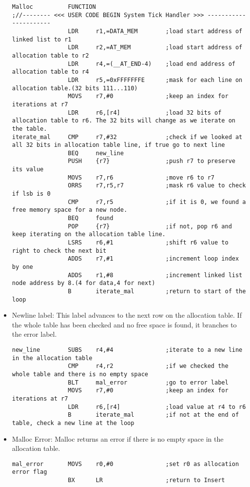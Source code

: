 \documentclass[pdftex,12pt,a4paper]{article}
\begin{document}
\begin{itemize}
\begin{lstlisting}[caption=Malloc iteration, style=customasm]
Malloc			FUNCTION			
;//-------- <<< USER CODE BEGIN System Tick Handler >>> ----------------------	
				LDR 	r1,=DATA_MEM		;load start address of linked list to r1
				LDR 	r2,=AT_MEM			;load start address of allocation table to r2
				LDR		r4,=(__AT_END-4)	;load end address of allocation table to r4
				LDR		r5,=0xFFFFFFFE		;mask for each line on allocation table.(32 bits 111...110)
				MOVS	r7,#0				;keep an index for iterations at r7
				LDR		r6,[r4]				;load 32 bits of allocation table to r6. The 32 bits will change as we iterate on the table.
iterate_mal		CMP		r7,#32				;check if we looked at all 32 bits in allocation table line, if true go to next line
				BEQ		new_line
				PUSH	{r7}				;push r7 to preserve its value
				MOVS	r7,r6				;move r6 to r7
				ORRS	r7,r5,r7			;mask r6 value to check if lsb is 0					
				CMP 	r7,r5				;if it is 0, we found a free memory space for a new node.
				BEQ		found
				POP		{r7}				;if not, pop r6 and keep iterating on the allocation table line.
				LSRS	r6,#1				;shift r6 value to right to check the next bit
				ADDS	r7,#1				;increment loop index by one
				ADDS	r1,#8				;increment linked list node address by 8.(4 for data,4 for next)
				B		iterate_mal			;return to start of the loop	
\end{lstlisting}

\item   Newline label: This label advances to the next row on the allocation table. If the whole table has been checked and no free space is found, it branches to the error label.

\begin{lstlisting}[caption=Malloc newline label, style=customasm]
new_line		SUBS	r4,#4				;iterate to a new line in the allocation table
				CMP		r4,r2				;if we checked the whole table and there is no empty space
				BLT		mal_error			;go to error label
				MOVS	r7,#0				;keep an index for iterations at r7
				LDR		r6,[r4]				;load value at r4 to r6
				B		iterate_mal			;if not at the end of table, check a new line at the loop
\end{lstlisting}

\item Malloc Error: Malloc returns an error if there is no empty space in the allocation table.
\begin{lstlisting}[caption=Malloc error label, style=customasm]
mal_error		MOVS	r0,#0				;set r0 as allocation error flag
				BX		LR					;return to Insert
\end{lstlisting}


\end{itemize}
\end{document}
